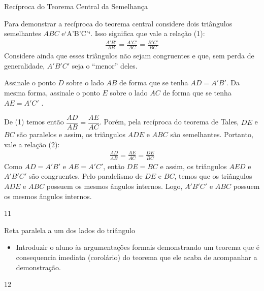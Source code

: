 \begin{sugestions}{Recíproca do Teorema Central da Semelhança}
{Para demonstrar a recíproca do teorema central considere dois triângulos semelhantes  \(ABC\) e{}`A’B’C’{\color{red}\bfseries{}{}`}. Isso significa que vale a relação (1):
\begin{equation*}
\begin{split}\frac{A'B'}{AB}=\frac{A'C'}{AC}=\frac{B'C'}{BC}\end{split}
\end{equation*}
Considere ainda que esses triângulos não sejam congruentes e que, sem perda de generalidade, \(A'B'C'\) seja o  “menor” deles.
\begin{center}\end{center}
Assinale o ponto \(D\) sobre o lado \(AB\) de forma que se tenha \(AD=A'B'\). Da mesma forma, assinale o ponto \(E\) sobre o lado \(AC\) de forma que se tenha \(AE=A'C'\) .

De (1) temos então \(\dfrac{AD}{AB}=\dfrac{AE}{AC}\). Porém, pela recíproca do teorema de Tales, \(DE\) e \(BC\) são paralelos e assim, os triângulos \(ADE\) e \(ABC\) são semelhantes. Portanto, vale a relação (2):
\begin{equation*}
\begin{split}\frac{AD}{AB}=\frac{AE}{AC}=\frac{DE}{BC}\end{split}
\end{equation*}
Como \(AD=A'B'\) e \(AE=A'C'\), então \(DE=BC\) e assim, os triângulos \(AED\) e \(A'B'C'\) são congruentes. Pelo paralelismo de \(DE\) e \(BC\), temos que os triângulos \(ADE\) e \(ABC\) possuem os mesmos ângulos internos. Logo, \(A'B'C'\) e \(ABC\) possuem os mesmos ângulos internos.}
{1}{1}
\end{sugestions}
\clearmargin
\begin{objectives}{Reta paralela a um dos lados do triângulo}
{
\begin{itemize}
\item {} 
Introduzir o aluno às argumentações formais demonstrando um teorema que é consequencia imediata (corolário) do teorema que ele acaba de acompanhar a demonstração.

\end{itemize}
}{1}{2}
\end{objectives}
